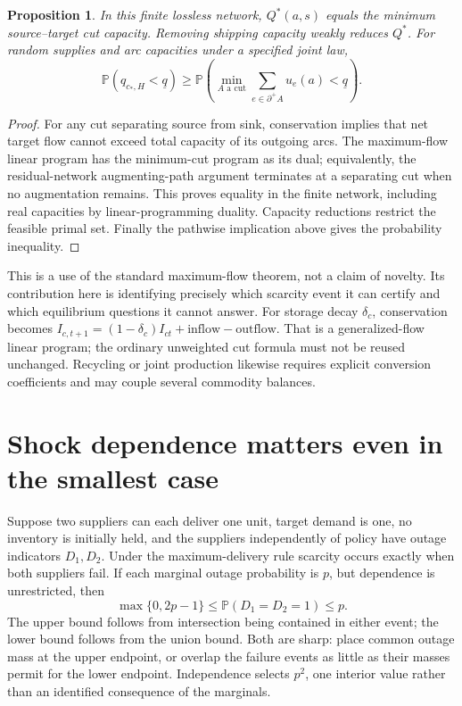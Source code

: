\documentclass[11pt]{article}
\newtheorem{proposition}{Proposition}
\newcommand{\Prb}{\mathbb P}
\begin{document}
\begin{proposition}
In this finite lossless network, $Q^*(a,s)$ equals the minimum source--target cut capacity. Removing shipping capacity weakly reduces $Q^*$. For random supplies and arc capacities under a specified joint law,
\[
 \Prb(q_{c_*,H}<\underline q)
 \geq\Prb\left(\min_{A\text{ a cut}}\sum_{e\in\partial^+ A}u_e(a)<\underline q\right).
\]
\end{proposition}
\begin{proof}
For any cut separating source from sink, conservation implies that net target flow cannot exceed total capacity of its outgoing arcs. The maximum-flow linear program has the minimum-cut program as its dual; equivalently, the residual-network augmenting-path argument terminates at a separating cut when no augmentation remains. This proves equality in the finite network, including real capacities by linear-programming duality. Capacity reductions restrict the feasible primal set. Finally the pathwise implication above gives the probability inequality.
\end{proof}

This is a use of the standard maximum-flow theorem, not a claim of novelty. Its contribution here is identifying precisely which scarcity event it can certify and which equilibrium questions it cannot answer. For storage decay $\delta_c$, conservation becomes $I_{c,t+1}=(1-\delta_c)I_{ct}+\text{inflow}-\text{outflow}$. That is a generalized-flow linear program; the ordinary unweighted cut formula must not be reused unchanged. Recycling or joint production likewise requires explicit conversion coefficients and may couple several commodity balances.

\section*{Shock dependence matters even in the smallest case}
Suppose two suppliers can each deliver one unit, target demand is one, no inventory is initially held, and the suppliers independently of policy have outage indicators $D_1,D_2$. Under the maximum-delivery rule scarcity occurs exactly when both suppliers fail. If each marginal outage probability is $p$, but dependence is unrestricted, then
\[
 \max\{0,2p-1\}\leq\Prb(D_1=D_2=1)\leq p.
\]
The upper bound follows from intersection being contained in either event; the lower bound follows from the union bound. Both are sharp: place common outage mass at the upper endpoint, or overlap the failure events as little as their masses permit for the lower endpoint. Independence selects $p^2$, one interior value rather than an identified consequence of the marginals.
\end{document}
